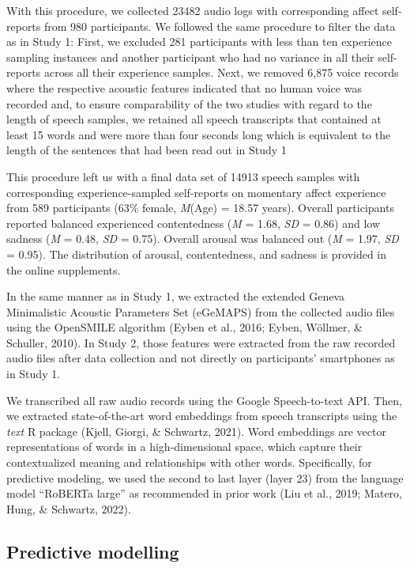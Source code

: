 \documentclass[
  english,
  man,floatsintext]{apa6}
\begin{document}
With this procedure, we collected 23482 audio logs with corresponding affect self-reports from 980 participants. We followed the same procedure to filter the data as in Study 1: First, we excluded 281 participants with less than ten experience sampling instances and another participant who had no variance in all their self-reports across all their experience samples. Next, we removed 6,875 voice records where the respective acoustic features indicated that no human voice was recorded and, to ensure comparability of the two studies with regard to the length of speech samples, we retained all speech transcripts that contained at least 15 words and were more than four seconds long which is equivalent to the length of the sentences that had been read out in Study 1

This procedure left us with a final data set of 14913 speech samples with corresponding experience-sampled self-reports on momentary affect experience from 589 participants (63\% female, \emph{M}(Age) = 18.57 years). Overall participants reported balanced experienced contentedness (\emph{M} = 1.68, \emph{SD} = 0.86) and low sadness (\emph{M} = 0.48, \emph{SD} = 0.75). Overall arousal was balanced out (\emph{M} = 1.97, \emph{SD} = 0.95). The distribution of arousal, contentedness, and sadness is provided in the online supplements.

In the same manner as in Study 1, we extracted the extended Geneva Minimalistic Acoustic Parameters Set (eGeMAPS) from the collected audio files using the OpenSMILE algorithm (Eyben et al., 2016; Eyben, Wöllmer, \& Schuller, 2010). In Study 2, those features were extracted from the raw recorded audio files after data collection and not directly on participants' smartphones as in Study 1.

We transcribed all raw audio records using the Google Speech-to-text API. Then, we extracted state-of-the-art word embeddings from speech transcripts using the \emph{text} R package (Kjell, Giorgi, \& Schwartz, 2021). Word embeddings are vector representations of words in a high-dimensional space, which capture their contextualized meaning and relationships with other words. Specifically, for predictive modeling, we used the second to last layer (layer 23) from the language model ``RoBERTa large'' as recommended in prior work (Liu et al., 2019; Matero, Hung, \& Schwartz, 2022).

\hypertarget{predictive-modelling}{%
\subsection{Predictive modelling}\label{predictive-modelling}}
\end{document}
